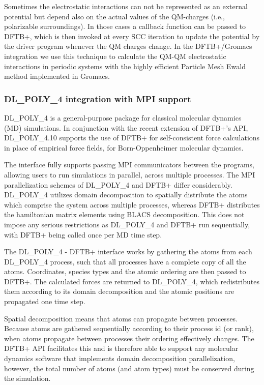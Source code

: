 \documentclass{revtex4-1}
\newcommand{\dftbp}{DFTB+}
\begin{document}
Sometimes the electrostatic interactions can not be represented as an external
potential but depend also on the actual values of the QM-charges (i.e.,
polarizable surroundings). In those cases a callback function can be
passed to \dftbp{}, which is then invoked at every SCC iteration to update the
potential by the driver program whenever the QM charges
change. In the \dftbp{}/Gromacs integration we use this technique to calculate
the QM-QM electrostatic interactions in periodic systems with the highly
efficient Particle Mesh Ewald method\cite{Darden1993} implemented in Gromacs.

\subsubsection{DL\_POLY\_4 integration with MPI support}

DL\_POLY\_4 is a general-purpose package for classical molecular dynamics (MD)
simu\-la\-tions.\cite{dl_poly2006} In conjunction with the recent extension of
\dftbp{}'s API, DL\_POLY\_4.10 supports the use of \dftbp{} for self-consistent
force calculations in place of empirical force fields, for Born-Oppenheimer
molecular dynamics.

The interface fully supports passing MPI communicators between the programs,
allowing users to run simulations in parallel, across multiple processes. The
MPI parallelization schemes of DL\_POLY\_4 and \dftbp{} differ
considerably. DL\_POLY\_4 utilizes domain decomposition to spatially distribute
the atoms which comprise the system across multiple processes, whereas \dftbp{}
distributes the hamiltonian matrix elements using BLACS decomposition. This does
not impose any serious restrictions as DL\_POLY\_4 and \dftbp{} run
sequentially, with \dftbp{} being called once per MD time step.

The DL\_POLY\_4 - \dftbp{} interface works by gathering the atoms from each
DL\_POLY\_4 process, such that all processes have a complete copy of all the
atoms. Coordinates, species types and the atomic ordering are then passed to
\dftbp{}.  The calculated forces are returned to DL\_POLY\_4, which
redistributes them according to its domain decomposition and the atomic
positions are propagated one time step.

Spatial decomposition means that atoms can propagate between processes. Because
atoms are gathered sequentially according to their process id (or rank), when
atoms propagate between processes their ordering effectively changes. The
\dftbp{} API facilitates this and is therefore able to support any molecular
dynamics software that implements domain decomposition parallelization, however,
the total number of atoms (and atom types) must be conserved during the
simulation.
\end{document}
